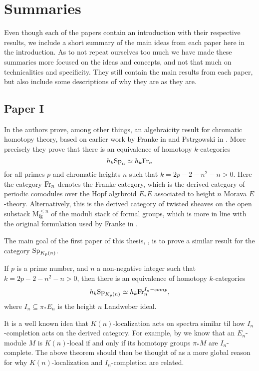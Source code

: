 \section{Summaries}

Even though each of the papers contain an introduction with their respective results, we include a short summary of the main ideas from each paper here in the introduction. As to not repeat ourselves too much we have made these summaries more focused on the ideas and concepts, and not that much on technicalities and specificity. They still contain the main results from each paper, but also include some descriptions of why they are as they are. 

\subsection{Paper I}

In \cite{patchkoria-pstragowski_2021} the authors prove, among other things, an algebraicity result for chromatic homotopy theory, based on earlier work by Franke in \cite{franke_96} and Pstr\a{}gowski in \cite{pstragowski_2021}. More precisely they prove that there is an equivalence of homotopy $k$-categories 
\[h_k \mathrm{Sp}_{n} \simeq h_k \mathrm{Fr}_{n}\]
for all primes $p$ and chromatic heights $n$ such that $k = 2p-2-n^2-n > 0$. Here the category $\mathrm{Fr}_{n}$ denotes the Franke category, which is the derived category of periodic comodules over the Hopf algrbroid $E_*E$ associated to height $n$ Morava $E$-theory. Alternatively, this is the derived category of twisted sheaves on the open substack $\mathrm{M}_{\mathrm{fg}}^{\leq n}$ of the moduli stack of formal groups, which is more in line with the original formulation used by Franke in \cite{franke_96}. 

The main goal of the first paper of this thesis, \cite{aambo_2024_algebraicity}, is to prove a similar result for the category $\mathrm{Sp}_{K_p(n)}$. 

\begin{theorem}
    \label{ch0:summary1:thm:main}
    If $p$ is a prime number, and $n$ a non-negative integer such that $k = 2p-2-n^2-n > 0$, then there is an equivalence of homotopy $k$-categories 
    \[h_k \mathrm{Sp}_{K_p(n)} \simeq h_k\mathrm{Fr}_{n}^{I_n-comp},\]
    where $I_n \subseteq \pi_* E_n$ is the height $n$ Landweber ideal. 
\end{theorem}

It is a well known idea that $K(n)$-localization acts on spectra similar til how $I_n$-completion acts on the derived category. For example, by \cite[3.14]{barthel-frankland_15} we know that an $E_n$-module $M$ is $K(n)$-local if and only if its homotopy groups $\pi_* M$ are $I_n$-complete. The above theorem should then be thought of as a more global reason for why $K(n)$-localization and $I_n$-completion are related. 

